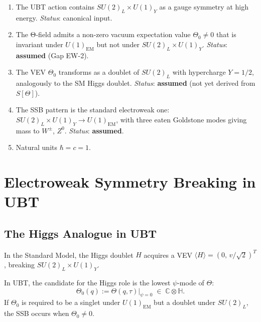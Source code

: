 \documentclass[12pt,a4paper]{article}
\theoremstyle{definition}
\theoremstyle{remark}
\begin{document}
\begin{enumerate}
  \item[\textbf{A1}] The UBT action contains $SU(2)_L \times U(1)_Y$ as a gauge
    symmetry at high energy.  \textit{Status}: canonical input.

  \item[\textbf{A2}] The Θ-field admits a non-zero vacuum expectation value
    $\Theta_0 \neq 0$ that is invariant under $U(1)_{\mathrm{EM}}$ but not under
    $SU(2)_L \times U(1)_Y$.  \textit{Status}: \textbf{assumed} (Gap EW-2).

  \item[\textbf{A3}] The VEV $\Theta_0$ transforms as a doublet of $SU(2)_L$ with
    hypercharge $Y = 1/2$, analogously to the SM Higgs doublet.
    \textit{Status}: \textbf{assumed} (not yet derived from $S[\Theta]$).

  \item[\textbf{A4}] The SSB pattern is the standard electroweak one:
    $SU(2)_L \times U(1)_Y \to U(1)_{\mathrm{EM}}$, with three eaten Goldstone modes
    giving mass to $W^\pm$, $Z^0$.  \textit{Status}: \textbf{assumed}.

  \item[\textbf{A5}] Natural units $\hbar = c = 1$.
\end{enumerate}

\section{Electroweak Symmetry Breaking in UBT}
\label{sec:sb:ewsb}

\subsection{The Higgs Analogue in UBT}

In the Standard Model, the Higgs doublet $H$ acquires a VEV
$\langle H \rangle = (0,\, v/\sqrt{2})^T$, breaking $SU(2)_L \times U(1)_Y$.

In UBT, the candidate for the Higgs role is the lowest $\psi$-mode of $\Theta$:
\begin{equation}
  \Theta_0(q) := \Theta(q, \tau)\big|_{\psi=0}
  \;\in\; \mathbb{C}\otimes\mathbb{H}.
  \label{eq:sb:Theta0}
\end{equation}
If $\Theta_0$ is required to be a singlet under $U(1)_{\mathrm{EM}}$ but a doublet
under $SU(2)_L$, the SSB occurs when $\Theta_0 \neq 0$.
\end{document}
